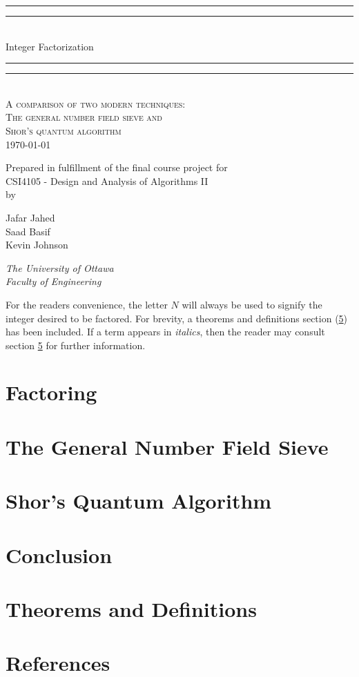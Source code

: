 \documentclass[10pt,a4paper]{article}
\theoremstyle{definition}
\newcommand*{\titleGP}{
  \begingroup %
  \centering %
  \vspace*{\baselineskip} %

  \rule{\textwidth}{1.6pt}\vspace*{-\baselineskip}\vspace*{2pt} %
  \rule{\textwidth}{0.4pt}\\[\baselineskip] %

  {\huge Integer Factorization}\\[0.2\baselineskip] %

  \rule{\textwidth}{0.4pt}\vspace*{-\baselineskip}\vspace{3.2pt} %
  \rule{\textwidth}{1.6pt}\\[\baselineskip] %

  \scshape %
  A comparison of two modern techniques: \\ %
  The general number field sieve and \\
  Shor's quantum algorithm  \\[\baselineskip] %
  \today \par %

  \vspace*{2\baselineskip} %

  Prepared in fulfillment of the final course project for \\
  CSI4105 - Design and Analysis of Algorithms II \\
  by \\[\baselineskip]
  {\Large Jafar Jahed \\ Saad Basif \\ Kevin Johnson \par} %

  \vspace*{2\baselineskip} 

  {\itshape The University of Ottawa \\ Faculty of Engineering \par} %

  \vfill %
  \endgroup
}
\begin{document}
  \titleGP
  \newpage
  \tableofcontents
  \newpage

  For the readers convenience, the letter $N$ will always be used to signify the integer desired to be factored. For brevity, a theorems and definitions section (\ref{theoremdef}) has been included. If a term appears in \textit{italics}, then the reader may consult section \ref{theoremdef} for further information.  

  \section{Factoring}
    
    \newpage
  \section{The General Number Field Sieve}
    
    \newpage
  \section{Shor's Quantum Algorithm}
  \section{Conclusion}
  \section{Theorems and Definitions} \label{theoremdef}
    
  \section{References}
    
\end{document}
